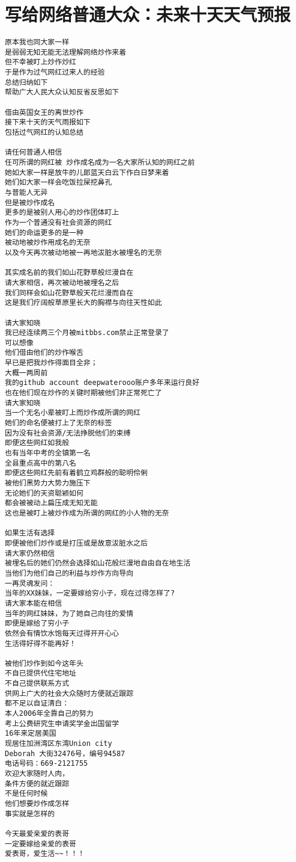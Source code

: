 \documentclass[9pt, b5paaper]{book}
\begin{document}
\chapter{写给网络普通大众：未来十天天气预报}
\label{sec-2}
\begin{verbatim}
原本我也同大家一样
是弱弱无知无能无法理解网络炒作来着
但不幸被盯上炒作炒红
于是作为过气网红过来人的经验
总结归纳如下
帮助广大人民大众认知反省反思如下

借由英国女王的离世炒作
接下来十天的天气雨报如下
包括过气网红的认知总结

请任何普通人相信
任可所谓的网红被 炒作成名成为一名大家所认知的网红之前
她如大家一样是放牛的儿郞蓝天白云下作白日梦来着
她们如大家一样会吃饭拉屎挖鼻孔
与普能人无异
但是被炒作成名
更多的是被别人用心的炒作团体盯上
作为一个普通没有社会资源的网红
她们的命运更多的是一种
被动地被炒作用成名的无奈
以及今天再次被动地被一再地沷脏水被埋名的无奈

其实成名前的我们如山花野草般烂漫自在
请大家相信，再次被动地被埋名之后
我们同样会如山花野草般天花烂漫而自在
这是我们疗阔般草原里长大的胸襟与向往天性如此

请大家知晓
我已经连续两三个月被mitbbs.com禁止正常登录了
可以想像
他们借由他们的炒作喉舌
早已是把我炒作得面目全非；
大概一两周前
我的github account deepwaterooo账户多年来运行良好
也在他们现在炒作的关键时期被他们非正常死亡了
请大家知晓
当一个无名小辈被盯上而炒作成所谓的网红
她们的命名便被打上了无奈的标签
因为没有社会资源/无法挣脱他们的束缚
即便这些网红如我般
也有当年中考的全镇第一名
全县重点高中的第八名
即便这些网红先前有着鹤立鸡群般的聪明伶俐
被他们黑势力大势力施压下
无论她们的天资聪颖如何
都会被被动上扁压成无知无能
这也是被盯上被炒作成为所谓的网红的小人物的无奈

如果生活有选择
即便被他们炒作或是打压或是故意沷脏水之后
请大家仍然相信
被埋名后的她们仍然会选择如山花般烂漫地自由自在地生活
当他们为他们自己的利益与炒作方向导向
一再灵魂发问：
当年的XX妹妹，一定要嫁给穷小子，现在过得怎样了?
请大家本能在相信
当年的网红妹妹，为了她自己向往的爱情
即便是嫁给了穷小子
依然会有情饮水饱每天过得开开心心
生活得好得不能再好！

被他们炒作到如今这年头
不自已提供代住宅地址
不自己提供联系方式
供网上广大的社会大众随时方便就近跟踪
都不足以自证清白：
本人2006年全靠自己的努力
考上公费研究生申请奖学金出国留学
16年来定居美国
现居住加洲湾区东湾Union city 
Deborah 大街32476号，编号94587
电话号码：669-2121755
欢迎大家随时人肉，
条件方便的就近跟踪
不是任何时候
他们想要炒作成怎样
事实就是怎样的

今天最爱亲爱的表哥
一定要嫁给亲爱的表哥
爱表哥，爱生活~~！！！
\end{verbatim}
\end{document}
